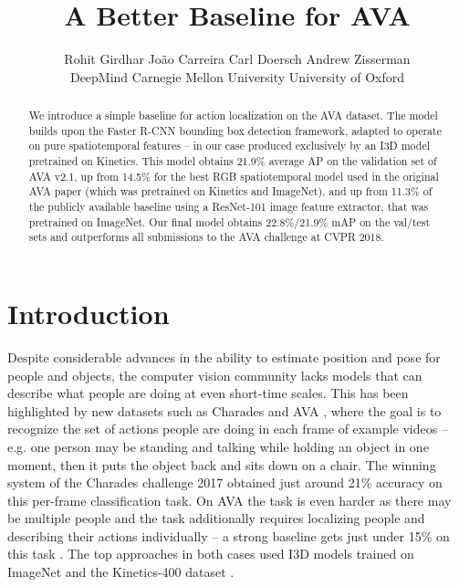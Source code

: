 \documentclass{article}
\title{A Better Baseline for AVA}
\author{Rohit Girdhar \quad   Jo{\~ a}o Carreira \quad Carl Doersch \quad Andrew Zisserman
\\    DeepMind \quad Carnegie Mellon University \quad University of Oxford}
\begin{document}
  
\maketitle


\begin{abstract}

  We introduce a simple baseline for action localization on the AVA dataset.
  The model builds upon the Faster R-CNN bounding box detection framework,
  adapted to operate on pure spatiotemporal features -- in our case produced exclusively by an I3D model pretrained on Kinetics. 
  This model obtains 21.9\%   average AP on the validation set of AVA v2.1,
  up from 14.5\% for the best RGB spatiotemporal model used in the original AVA paper
  (which was pretrained on Kinetics and ImageNet),
  and up from 11.3\% of the publicly available baseline using a ResNet-101 image feature extractor,
  that was pretrained on ImageNet.
  Our final model obtains 22.8\%/21.9\% mAP on the val/test sets and { outperforms all submissions} to the AVA challenge at CVPR 2018.



\end{abstract}

\section{Introduction}

  Despite considerable advances in the ability to estimate position and pose for people and objects, the computer vision community lacks models that can describe what people are doing at even short-time scales. 
  This has been highlighted by new datasets such as Charades \cite{sigurdsson2016hollywood} and AVA \cite{gu2017ava}, where the goal is to recognize the set of actions people are doing in each frame of example videos -- e.g. one person may be standing and talking while holding an object in one moment, then it puts the object back and sits down on a chair. 
  The winning system of the Charades challenge 2017 obtained just around 21\% accuracy on this per-frame classification task. 
  On AVA the task is even harder as there may be multiple people and the task additionally requires localizing people and describing their actions individually -- a strong baseline gets just under 15\% on this task \cite{gu2017ava}. 
  The top approaches in both cases used I3D models trained on ImageNet \cite{russakovsky2015imagenet} and the Kinetics-400 dataset \cite{kay2017kinetics}.
\end{document}
